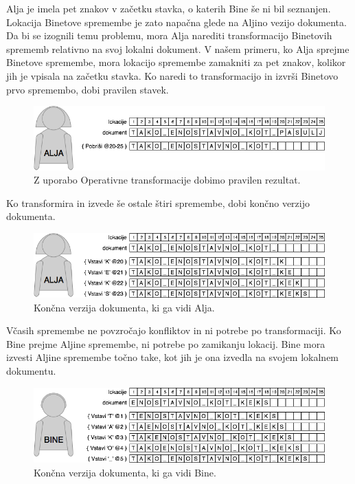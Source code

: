 \documentclass[a4paper, 12pt, twoside]{book}
\begin{document}
\pagebreak

Alja je imela pet znakov v začetku stavka, o katerih Bine še ni bil seznanjen. Lokacija Binetove spremembe je zato napačna glede na Aljino vezijo dokumenta. Da bi se izognili temu problemu, mora Alja narediti transformacijo Binetovih sprememb relativno na svoj lokalni dokument. V našem primeru, ko Alja sprejme Binetove spremembe, mora lokacijo spremembe zamakniti za pet znakov, kolikor jih je vpisala na začetku stavka. Ko naredi to transformacijo in izvrši Binetovo prvo spremembo, dobi pravilen stavek.

\begin{figure}[placement h]
\begin{center}
\includegraphics[width=12cm]{ot4.png}
\end{center}
\caption{Z uporabo Operativne transformacije dobimo pravilen rezultat.}
\label{ot4}
\end{figure}

Ko transformira in izvede še ostale štiri spremembe, dobi končno verzijo dokumenta.

\begin{figure}[placement h]
\begin{center}
\includegraphics[width=12cm]{ot5.png}
\end{center}
\caption{Končna verzija dokumenta, ki ga vidi Alja.}
\label{ot5}
\end{figure}

Včasih spremembe ne povzročajo konfliktov in ni potrebe po transformaciji. Ko Bine prejme Aljine spremembe, ni potrebe po zamikanju lokacij. Bine mora izvesti Aljine spremembe točno take, kot jih je ona izvedla na svojem lokalnem dokumentu.

\begin{figure}[placement h]
\begin{center}
\includegraphics[width=12cm]{ot6.png}
\end{center}
\caption{Končna verzija dokumenta, ki ga vidi Bine.}
\label{ot6}
\end{figure}
\end{document}
